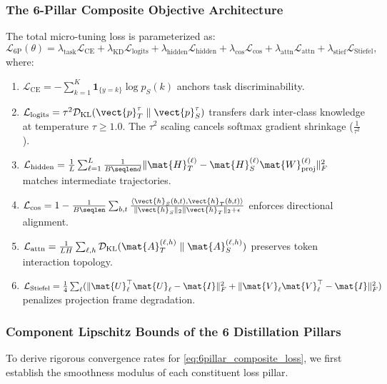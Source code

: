 \subsubsection{The 6-Pillar Composite Objective Architecture}
The total micro-tuning loss is parameterized as:
\begin{equation}
\mathcal{L}_{\text{6P}}(\theta) = \lambda_{\text{task}} \mathcal{L}_{\text{CE}} + \lambda_{\text{KD}} \mathcal{L}_{\text{logits}} + \lambda_{\text{hidden}} \mathcal{L}_{\text{hidden}} + \lambda_{\text{cos}} \mathcal{L}_{\text{cos}} + \lambda_{\text{attn}} \mathcal{L}_{\text{attn}} + \lambda_{\text{stief}} \mathcal{L}_{\text{Stiefel}},
\label{eq:6pillar_composite_loss}
\end{equation}
where:
\begin{enumerate}
    \item $\mathcal{L}_{\text{CE}} = - \sum_{k=1}^K \mathbf{1}_{\{y = k\}} \log p_S(k)$ anchors task discriminability.
    \item $\mathcal{L}_{\text{logits}} = \tau^2 \mathcal{D}_{\text{KL}}(\vect{p}_T^\tau \parallel \vect{p}_S^\tau)$ transfers dark inter-class knowledge at temperature $\tau \ge 1.0$. The $\tau^2$ scaling cancels softmax gradient shrinkage ($\frac{1}{\tau^2}$).
    \item $\mathcal{L}_{\text{hidden}} = \frac{1}{L} \sum_{\ell=1}^L \frac{1}{B \seqlen d} \|\mat{H}_T^{(\ell)} - \mat{H}_S^{(\ell)} \mat{W}_{\text{proj}}^{(\ell)}\|_F^2$ matches intermediate trajectories.
    \item $\mathcal{L}_{\text{cos}} = 1 - \frac{1}{B \seqlen} \sum_{b,t} \frac{\langle \vect{h}_S(b,t), \vect{h}_T(b,t) \rangle}{\|\vect{h}_S\|_2 \|\vect{h}_T\|_2 + \epsilon}$ enforces directional alignment.
    \item $\mathcal{L}_{\text{attn}} = \frac{1}{L H} \sum_{\ell, h} \mathcal{D}_{\text{KL}}(\mat{A}_T^{(\ell, h)} \parallel \mat{A}_S^{(\ell, h)})$ preserves token interaction topology.
    \item $\mathcal{L}_{\text{Stiefel}} = \frac{1}{4} \sum_\ell (\|\mat{U}_\ell^\top \mat{U}_\ell - \mat{I}\|_F^2 + \|\mat{V}_\ell \mat{V}_\ell^\top - \mat{I}\|_F^2)$ penalizes projection frame degradation.
\end{enumerate}

\subsubsection{Component Lipschitz Bounds of the 6 Distillation Pillars}
To derive rigorous convergence rates for \eqref{eq:6pillar_composite_loss}, we first establish the smoothness modulus of each constituent loss pillar.

